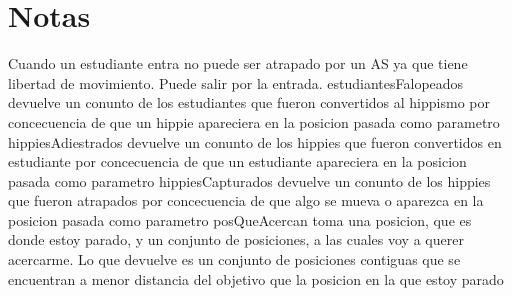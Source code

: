 \documentclass[10pt, a4paper]{article}
\renewcommand{\paratodo}[2]{$\forall~#2$: #1}
\begin{document}
\begin{tad}{}





\tadGeneradores


\tadObservadores


\tadAxiomas[\paratodo{nat}{an, al}, \paratodo{grilla}{g}, \paratodo{posicion}{p}]




\end{tad}

\section{Notas}

Cuando un estudiante entra no puede ser atrapado por un AS ya que tiene libertad de movimiento. Puede salir por la entrada.
\newline estudiantesFalopeados devuelve un conunto de los estudiantes que fueron convertidos al hippismo por concecuencia de que un hippie apareciera en la posicion pasada como parametro
\newline hippiesAdiestrados devuelve un conunto de los hippies que fueron convertidos en estudiante por concecuencia de que un estudiante apareciera en la posicion pasada como parametro
\newline hippiesCapturados devuelve un conunto de los hippies que fueron atrapados por concecuencia de que algo se mueva o aparezca en la posicion pasada como parametro
\newline posQueAcercan toma una posicion, que es donde estoy parado, y un conjunto de posiciones, a las cuales voy a querer acercarme. Lo que devuelve es un conjunto de posiciones contiguas que se encuentran a menor distancia del objetivo que la posicion en la que estoy parado
\end{document}
